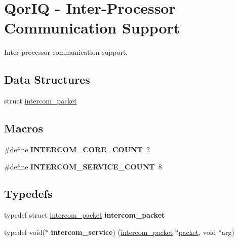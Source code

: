 \hypertarget{group__QorIQInterCom}{}\section{Qor\+IQ -\/ Inter-\/\+Processor Communication Support}
\label{group__QorIQInterCom}


Inter-\/processor communication support.  


\subsection*{Data Structures}
\begin{DoxyCompactItemize}
\item 
struct \mbox{\hyperlink{structintercom__packet}{intercom\+\_\+packet}}
\end{DoxyCompactItemize}
\subsection*{Macros}
\begin{DoxyCompactItemize}
\item 
\mbox{\label{group__QorIQInterCom_gaf08feb9c4ba81f14d1a0fa105ba98012}} 
\#define {\bfseries I\+N\+T\+E\+R\+C\+O\+M\+\_\+\+C\+O\+R\+E\+\_\+\+C\+O\+U\+NT}~2
\item 
\mbox{\label{group__QorIQInterCom_ga58c16ad9f357737d6933878bb718e7a4}} 
\#define {\bfseries I\+N\+T\+E\+R\+C\+O\+M\+\_\+\+S\+E\+R\+V\+I\+C\+E\+\_\+\+C\+O\+U\+NT}~8
\end{DoxyCompactItemize}
\subsection*{Typedefs}
\begin{DoxyCompactItemize}
\item 
\mbox{\label{group__QorIQInterCom_ga0338af46026068824f677e4b53e8792e}} 
typedef struct \mbox{\hyperlink{structintercom__packet}{intercom\+\_\+packet}} {\bfseries intercom\+\_\+packet}
\item 
\mbox{\label{group__QorIQInterCom_gaa988ef44797ddce851397a861fda6276}} 
typedef void($\ast$ {\bfseries intercom\+\_\+service}) (\mbox{\hyperlink{structintercom__packet}{intercom\+\_\+packet}} $\ast$\mbox{\hyperlink{structpacket}{packet}}, void $\ast$arg)
\end{DoxyCompactItemize}
